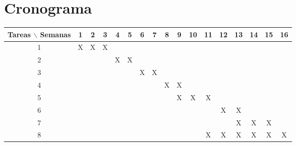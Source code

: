 \documentclass[12pt]{article}
\begin{document}



\section{Cronograma}

\begin{table}[htb]
	\begin{tabular}{|c|cccccccccccccccc| }
	\hline
	Tareas $\backslash$ Semanas & 1 & 2 & 3 & 4 & 5 & 6 & 7 & 8 & 9 & 10 & 11 & 12 & 13 & 14 & 15 & 16  \\
	\hline
	1 & X & X & X &   &   &   &   &   &   &   &   &   &   &   &   &   \\
	2 &   &   &   & X & X &   &   &   &   &   &   &   &   &   &   &   \\
	3 &   &   &   &   &   & X & X &   &   &   &   &   &   &   &   &   \\
	4 &   &   &   &   &   &   &   & X & X &   &   &   &   &   &   &   \\
	5 &   &   &   &   &   &   &   &   & X & X & X &   &   &   &   &   \\
	6 &   &   &   &   &   &   &   &   &   &   &   & X & X &   &   &   \\
	7 &   &   &   &   &   &   &   &   &   &   &   &   & X & X & X &   \\
	8 &   &   &   &   &   &   &   &   &   &   & X & X & X & X & X & X \\
	\hline
	\end{tabular}
\end{table}
\vspace{1mm}
\end{document}
